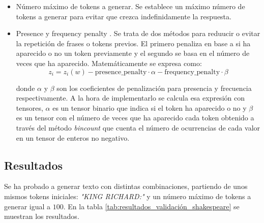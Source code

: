 \documentclass[11pt]{book}
\begin{document}
\begin{itemize}
    \item Número máximo de tokens a generar. Se establece un máximo número de tokens a generar para evitar que crezca indefinidamente la respuesta.
    
    \item Presence y frequency penalty \parencite{vyas2025transformer_decoder_part3}.
Se trata de dos métodos para reduucir o evitar la repetición de frases o tokens previos. El primero penaliza en base a si ha aparecido o no un token previamente y el segundo se basa en el número de veces que ha aparecido. Matemáticamente se expresa como: 
    \[
        z_i = z_i(w) - \text{presence\_penalty} \cdot \alpha - \text{frequency\_penalty} \cdot \beta
    \]

    donde $\alpha$ y $\beta$ son los coeficientes de penalización para presencia y frecuencia respectivamente.
A la hora de implementarlo se calcula esa expresión con tensores, $\alpha$ es un tensor binario que indica si el token ha aparecido o no y $\beta$ es un tensor con el número de veces que ha aparecido cada token obtenido a través del método \textit{bincount} que cuenta el número de ocurrencias de cada valor en un tensor de enteros no negativo.
\end{itemize}
\subsection{Resultados}

Se ha probado a generar texto con distintas combinaciones, partiendo de unos mismos tokens iniciales: \textit{"KING RICHARD:"} y un número máximo de tokens a generar igual a $100$. En la tabla \ref{tab:resultados_validación_shakespeare} se muestran los resultados.
\end{document}
